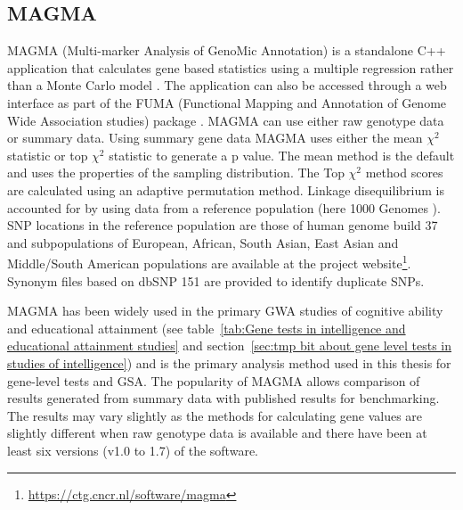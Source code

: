 \subsection{MAGMA}
\label{sec:MAGMA_gene_scores}

MAGMA (Multi-marker Analysis of GenoMic Annotation) is a standalone C++ application that calculates  gene based statistics using a multiple regression rather than a Monte Carlo model \cite{de2015magma}. The application can also be accessed through a web interface as part of the FUMA (Functional Mapping and Annotation of Genome Wide Association studies) package \cite{watanabe2017functional}. MAGMA can use either raw genotype data or summary data. Using summary gene data MAGMA uses either the mean $\chi^2$ statistic or top $\chi^2$ statistic to generate a p value. The mean method is the default and uses the properties of the sampling distribution\cite{brown1975400}. The Top $\chi^2$ method scores are calculated using an adaptive permutation method. Linkage disequilibrium is accounted for by using  data from a reference population (here 1000 Genomes \cite{10002012integrated}). SNP locations in the reference population are those of human genome build 37 and subpopulations of European, African, South Asian, East Asian and Middle/South American populations are available at the project website\footnote{\url{https://ctg.cncr.nl/software/magma}}. Synonym files based on dbSNP 151 are provided to identify duplicate SNPs. 



MAGMA has been widely used in the primary GWA studies of cognitive ability and educational attainment (see table~\ref{tab:Gene tests in intelligence and educational attainment studies} and section~\ref{sec:tmp bit about gene level tests in studies of intelligence}) and is the primary analysis method used in this thesis for gene-level tests and GSA. The popularity of MAGMA allows comparison of results generated from summary data with published results for benchmarking. The results may vary slightly as the methods for calculating gene values are slightly different when raw genotype data is available and there have been at least six versions (v1.0 to 1.7) of the software. 


